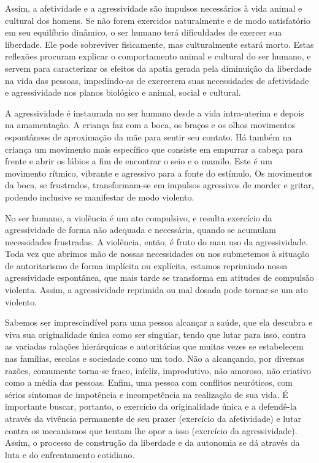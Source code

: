 Assim, a afetividade e a agressividade são impulsos necessários à vida
animal e cultural dos homens. Se não forem exercidos naturalmente e de
modo satisfatório em seu equilíbrio dinâmico, o ser humano terá
dificuldades de exercer sua liberdade. Ele pode sobreviver fisicamente,
mas culturalmente estará morto. Estas reflexões procuram explicar o
comportamento animal e cultural do ser humano, e servem para
caracterizar os efeitos da apatia gerada pela diminuição da liberdade na
vida das pessoas, impedindo-as de exercerem suas necessidades de
afetividade e agressividade nos planos biológico e animal, social e
cultural.

A agressividade é instaurada no ser humano desde a vida intra-uterina e
depois na amamentação. A criança faz com a boca, os braços e os olhos
movimentos espontâneos de aproximação da mãe para sentir seu contato. Há
também na criança um movimento mais específico que consiste em empurrar
a cabeça para frente e abrir os lábios a fim de encontrar o seio e o
mamilo. Este é um movimento rítmico, vibrante e agressivo para a fonte
do estímulo. Os movimentos da boca, se frustrados, transformam-se em
impulsos agressivos de morder e gritar, podendo inclusive se manifestar
de modo violento.

No ser humano, a violência é um ato compulsivo, e resulta exercício da
agressividade de forma não adequada e necessária, quando se acumulam
necessidades frustradas. A violência, então, é fruto do mau uso da
agressividade. Toda vez que abrimos mão de nossas necessidades ou nos
submetemos à situação de autoritarismo de forma implícita ou explícita,
estamos reprimindo nossa agressividade espontânea, que mais tarde se
transforma em atitudes de compulsão violenta. Assim, a agressividade
reprimida ou mal dosada pode tornar-se um ato violento.

Sabemos ser imprescindível para uma pessoa alcançar a saúde, que ela
descubra e viva sua originalidade única como ser singular, tendo que
lutar para isso, contra as variadas ralações hierárquicas e autoritárias
que muitas vezes se estabelecem nas famílias, escolas e sociedade como
um todo. Não a alcançando, por diversas razões, comumente torna-se
fraco, infeliz, improdutivo, não amoroso, não criativo como a média das
pessoas. Enfim, uma pessoa com conflitos neuróticos, com sérios sintomas
de impotência e incompetência na realização de sua vida. É importante
buscar, portanto, o exercício da originalidade única e a defendê-la
através da vivência permanente de seu prazer (exercício da afetividade)
e lutar contra os mecanismos que tentam lhe opor a isso (exercício da
agressividade). Assim, o processo de construção da liberdade e da
autonomia se dá através da luta e do enfrentamento cotidiano.

